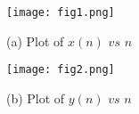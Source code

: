 \documentclass[journal,12pt,twocolumn]{IEEEtran}
\theoremstyle{remark}
\begin{document}
	\newpage
	
	\begin{figure}[htbp]
		\centering
		\texttt{[image: fig1.png]}
		\caption*{\hspace{2cm} (a) Plot of $x(n)$ $vs$ $n$}
	\end{figure}
	
	\begin{figure}[htbp]
		\centering
		\texttt{[image: fig2.png]}
		\caption*{\hspace{2cm} (b) Plot of $y(n)$ $vs$ $n$}
		
	\end{figure}
	
\end{document}
